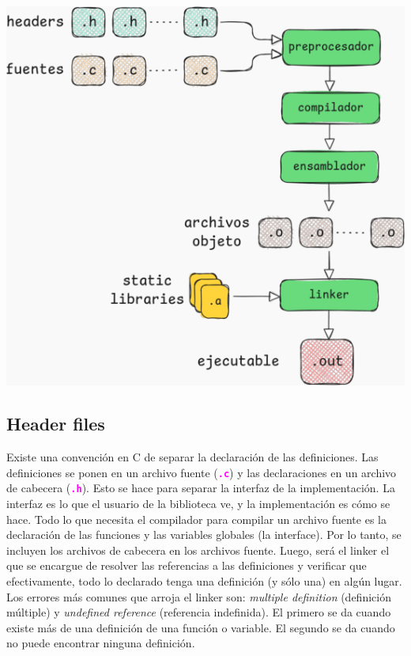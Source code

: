 \documentclass[]{scrartcl}
\newcommand{\hl}[1]{\textcolor{magenta}{\textbf{\texttt{#1}}}}
\begin{document}
\begin{center}
  \includegraphics[scale=0.5]{./img/compilacion.png}
  
  \label{fig:compilacion}
\end{center}



\subsection*{Header files}

Existe una convención en C de separar la declaración de las definiciones. Las definiciones se ponen en un archivo fuente (\hl{.c}) y las declaraciones en un archivo de cabecera (\hl{.h}). Esto se hace para separar la interfaz de la implementación. La interfaz es lo que el usuario de la biblioteca ve, y la implementación es cómo se hace. Todo lo que necesita el compilador para compilar un archivo fuente es la declaración de las funciones y las variables globales (la interface). Por lo tanto, se incluyen los archivos de cabecera en los archivos fuente. Luego, será el linker el que se encargue de resolver las referencias a las definiciones y verificar que efectivamente, todo lo declarado tenga una definición (y sólo una) en algún lugar. Los errores más comunes que arroja el linker son: \textit{multiple definition} (definición múltiple) y \textit{undefined reference} (referencia indefinida). El primero se da cuando existe más de una definición de una función o variable. El segundo se da cuando no puede encontrar ninguna definición.
\end{document}
